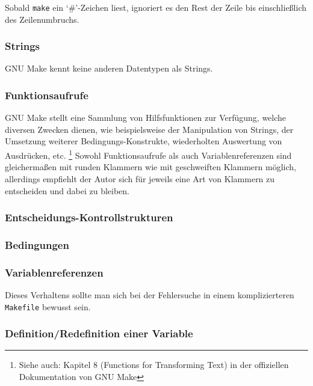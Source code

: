 	Sobald \texttt{make} ein `\#'-Zeichen liest, ignoriert es den Rest der
	Zeile bis einschließlich des Zeilenumbruchs.
%
\subsubsection*{Strings}  

	GNU Make kennt keine anderen Datentypen als Strings.
%
\subsubsection*{Funktionsaufrufe}  
	
	GNU Make stellt eine Sammlung von Hilfsfunktionen zur Verfügung, welche
	diversen Zwecken dienen, wie beispielsweise der Manipulation von
	Strings, der Umsetzung weiterer Bedingungs-Konstrukte, wiederholten
	Auswertung von Ausdrücken, etc.  \footnote{Siehe auch: Kapitel 8 (Functions
	for Transforming Text) in der offiziellen Dokumentation von GNU Make
	}
%
	Sowohl Funktionsaufrufe als auch Variablenreferenzen sind gleichermaßen
	mit runden Klammern wie mit geschweiften Klammern möglich, allerdings
	empfiehlt der Autor sich für jeweils eine Art von Klammern zu
	entscheiden und dabei zu bleiben.
\subsubsection*{Entscheidungs-Kontrollstrukturen}	

%
\subsubsection*{Bedingungen}  
%
\subsubsection*{Variablenreferenzen}  

	\noindent
	
	Dieses Verhaltens sollte man sich bei der Fehlersuche in einem
	komplizierteren \texttt{Makefile} bewusst sein.
%
\subsubsection*{Definition/Redefinition einer Variable}


